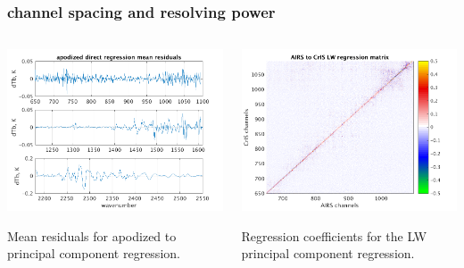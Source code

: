 \documentclass[10pt]{beamer}
\begin{document}
\begin{frame}
\frametitle{channel spacing and resolving power}
\begin{columns}[t]
\begin{column}{0.5\textwidth}
  \begin{centering}
  \includegraphics[width=\textwidth]{slackfigs/ap_pc_direct_regr.png}
  \end{centering}\vspace{3mm}
  Mean residuals for apodized {\airs} to {\cris} principal component
  regression.

\end{column}
\begin{column}{0.5\textwidth}  
  \begin{centering}
  \includegraphics[width=\textwidth]{slackfigs/LW_pc_regr_mat.png}
  \end{centering}\vspace{3mm}
  Regression coefficients for the LW principal component regression.
 
\end{column}
\end{columns}
\end{frame}
\end{document}

